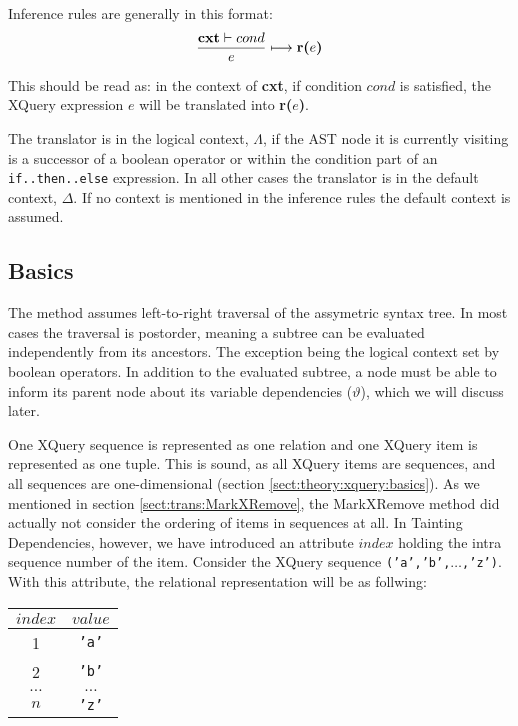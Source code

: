 Inference rules are generally in this format:
\begin{equation*}
\frac{\mbox{\textbf{cxt}}\vdash cond}{e}\longmapsto \mbox{\textbf{r(}}e\mbox{\textbf{)}}
\end{equation*}

This should be read as: in the context of \textbf{cxt}, if condition $cond$ is satisfied, the XQuery expression
$e$ will be translated into \textbf{r(}$e$\textbf{)}.

The translator is in the logical context, $\Lambda$, if the AST node it is currently visiting is a successor of a
boolean operator or within the condition part of an \texttt{if..then..else} expression. In all other cases the
translator is in the default context, $\Delta$. If no context is mentioned in the inference rules the default
context is assumed.

\subsection{Basics}
\label{sect:trans:TD:basics}
The method assumes left-to-right traversal of the assymetric syntax tree. In most cases the traversal is
postorder, meaning a subtree can be evaluated independently from its ancestors. The exception being the logical
context set by boolean operators. In addition to the evaluated subtree, a node must be able to inform its parent
node about its variable dependencies ($\vartheta$), which we will discuss later.

One XQuery sequence is represented as one relation and one XQuery item is represented as one tuple. This is sound,
as all XQuery items are sequences, and all sequences are one-dimensional (section
\ref{sect:theory:xquery:basics}). As we mentioned in section \ref{sect:trans:MarkXRemove}, the MarkXRemove method
did actually not consider the ordering of items in sequences at all. In Tainting Dependencies, however, we have
introduced an attribute $index$ holding the intra sequence number of the item. Consider the XQuery sequence
\texttt{('a','b',}$\ldots$\texttt{,'z')}. With this attribute, the relational representation will be as follwing:

\begin{center}
\begin{tabular}{|c|c|} \hline
$index$ & $value$ \\\hline
1		& \texttt{'a'} \\\hline
2		& \texttt{'b'} \\\hline
$\ldots$& $\ldots$ \\\hline
$n$		& \texttt{'z'} \\\hline
\end{tabular}
\end{center}


